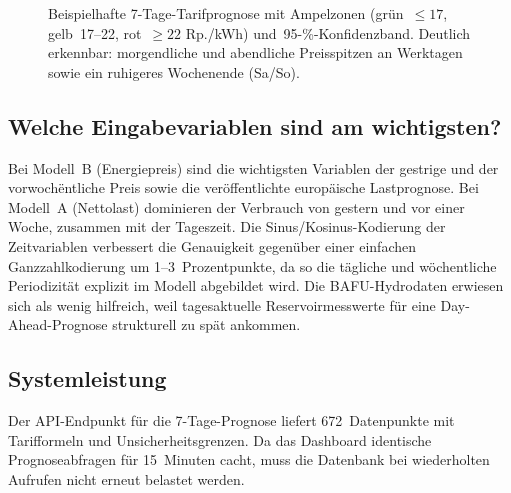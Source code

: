 \documentclass[sigconf]{acmart}
\begin{document}
\begin{figure}[htb]
  \caption{Beispielhafte 7-Tage-Tarifprognose mit Ampelzonen
           (gr\"un~$\leq 17$, gelb~17--22, rot~$\geq 22$ Rp./kWh)
           und~95-\%-Konfidenzband.
           Deutlich erkennbar: morgendliche und abendliche Preisspitzen
           an Werktagen sowie ein ruhigeres Wochenende (Sa/So).}
  \label{fig:forecast}
\end{figure}

\subsection{Welche Eingabevariablen sind am wichtigsten?}

Bei Modell~B (Energiepreis) sind die wichtigsten Variablen
der gestrige und der vorwoch\"entliche Preis sowie die ver\"offentlichte
europ\"aische Lastprognose.
Bei Modell~A (Nettolast) dominieren der Verbrauch von gestern und
vor einer Woche, zusammen mit der Tageszeit.
Die Sinus/Kosinus-Kodierung der Zeitvariablen verbessert die
Genauigkeit gegen\"uber einer einfachen Ganzzahlkodierung
um 1--3~Prozentpunkte, da so die t\"agliche und w\"ochentliche
Periodizit\"at explizit im Modell abgebildet wird.
Die BAFU-Hydrodaten erwiesen sich als wenig hilfreich, weil
tages\-aktuelle Reservoirmesswerte f\"ur eine Day-Ahead-Prognose
strukturell zu sp\"at ankommen.

\subsection{Systemleistung}

Der API-Endpunkt f\"ur die 7-Tage-Prognose liefert 672~Datenpunkte mit
Tarifformeln und Unsicherheitsgrenzen.
Da das Dashboard identische Prognoseabfragen f\"ur 15~Minuten cacht,
muss die Datenbank bei wiederholten Aufrufen nicht erneut belastet werden.
\end{document}
